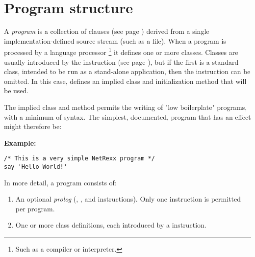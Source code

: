 \chapter{Program structure}\label{refpstruct}
 A \nr{} \emph{program} is a collection of
 clauses (see page \pageref{refclau})  derived from a single implementation-defined
source stream (such as a file).
When a program is processed by a language processor
\footnote{
Such as a compiler or interpreter.
}
it defines one or more classes.
Classes are usually introduced by the   instruction (see page \pageref{refclass}), but if the first is a standard class, intended to be
run as a stand-alone application, then the  instruction
can be omitted.  In this case, \nr{} defines an implied class
and initialization method that will be used.
 
The implied class and method permits the writing of "low
boilerplate" programs, with a minimum of syntax.
The simplest, documented, \nr{} program that has an effect might
therefore be:
 
\textbf{Example:}
\begin{lstlisting}[label=hello,caption=hello.nrx]
/* This is a very simple NetRexx program */
say 'Hello World!'
\end{lstlisting}
 
In more detail, a \nr{} program consists of:
\begin{enumerate}
\item An optional \emph{prolog} (, , and
 instructions).  Only one  instruction
is permitted per program.
\item  One or more class definitions, each introduced by a 
instruction.
\end{enumerate}
 
